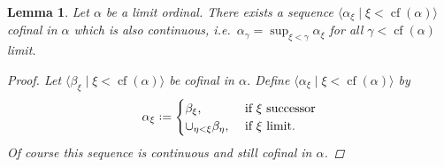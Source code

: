 \documentclass[11pt,a4paper]{report}
\newtheorem{lemma}[theorem]{Lemma}
\theoremstyle{definition}
\theoremstyle{num.custom-title}
\theoremstyle{custom-title}
\DeclareMathOperator{\cf}{cf}
\newcommand*{\defeq}{\mathrel{\rlap{%
                     \raisebox{0.3ex}{$\cdot$}}%
                     \raisebox{-0.3ex}{$\cdot$}}%
                     =}
\begin{document}
\begin{lemma}\label{lemma-cof_continua}
Let $\alpha$ be a limit ordinal. There exists a sequence $\langle \alpha_\xi \mid \xi < \cf(\alpha) \rangle$ cofinal in $\alpha$ which is also \emph{continuous}, i.e.\ $\alpha_\gamma = \sup_{\xi<\gamma} \alpha_\xi$ for all $\gamma < \cf(\alpha)$ limit.
\begin{proof}
Let $\langle \beta_\xi \mid \xi < \cf(\alpha) \rangle$ be cofinal in $\alpha$. Define $\langle \alpha_\xi \mid \xi < \cf(\alpha) \rangle$ by
\[
\alpha_\xi \defeq
\begin{cases}
\beta_\xi, & \text{ if $\xi$ successor} \\
\cup_{\eta < \xi} \beta_\eta, & \text{ if $\xi$ limit}.
\end{cases}
\]
Of course this sequence is continuous and still cofinal in $\alpha$.
\end{proof}
\end{lemma}
\end{document}
